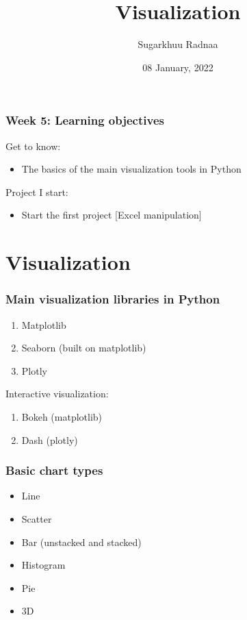 \documentclass{beamer}
\title[Introduction to Python]{Visualization}
\author{Sugarkhuu Radnaa}
\institute[]
{
Py4Econ in Ulaanbaatar \\ 
\medskip
\textit{py4econ@gmail.com} 
}
\date{08 January, 2022}  %
\begin{document}
\begin{frame}
\titlepage %
\end{frame}

\begin{frame}
    \frametitle{Week 5: Learning objectives}
    Get to know: 
    \begin{itemize}
        \item The basics of the main visualization tools in Python
    \end{itemize}
\vskip 1cm        
    Project I start:
    \begin{itemize} 
        \item Start the first project [Excel manipulation]
    \end{itemize}
\end{frame}

\section{Visualization} 

\begin{frame}
\frametitle{Main visualization libraries in Python}
    \begin{enumerate}
        \item Matplotlib
        \item Seaborn (built on matplotlib)
        \item Plotly       
    \end{enumerate}

\vskip 5mm
Interactive visualization:     
    \begin{enumerate}
        \item Bokeh (matplotlib) 
        \item Dash (plotly)
    \end{enumerate}

\end{frame}

\begin{frame}
    \frametitle{Basic chart types}
        \begin{itemize}
        \item Line
        \item Scatter
        \item Bar (unstacked and stacked)
        \item Histogram
        \item Pie
        \item 3D
        \end{itemize}
\end{frame}
\end{document}
